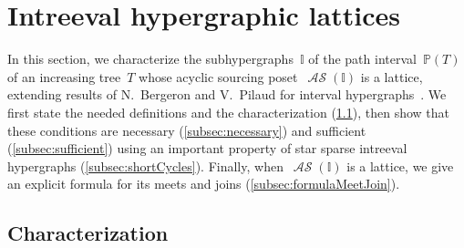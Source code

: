\documentclass{amsart}
\theoremstyle{definition}
\DeclareMathOperator{\ASour}{\mathcal{AS}}  %
\newcommand{\II}{\mathbb I} %
\newcommand{\PP}{\mathbb P} %
\begin{document}


\section{Intreeval hypergraphic lattices}
\label{sec:intreevalHypergraphicPosets}

In this section, we characterize the subhypergraphs~$\II$ of the path interval~$\PP(T)$ of an increasing tree~$T$ whose acyclic sourcing poset~$\ASour(\II)$ is a lattice, extending results of N.~Bergeron and V.~Pilaud for interval hypergraphs~\cite{BergeronPilaud}.
We first state the needed definitions and the characterization (\cref{subsec:characterization}), then show that these conditions are necessary (\cref{subsec:necessary}) and sufficient (\cref{subsec:sufficient}) using an important property of star sparse intreeval hypergraphs (\cref{subsec:shortCycles}).
Finally, when~$\ASour(\II)$ is a lattice, we give an explicit formula for its meets and joins (\cref{subsec:formulaMeetJoin}).


\subsection{Characterization}
\label{subsec:characterization}
\end{document}
